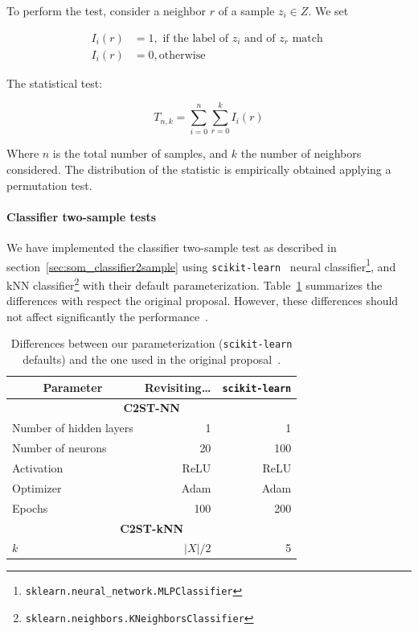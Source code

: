 To perform the test, consider a neighbor $r$ of a sample $z_i \in Z$. We set

\begin{equation}
\begin{split}
    I_i(r) &= 1, \textrm{ if the label of } z_i \textrm{ and of } z_r \textrm{ match }\\
    I_i(r) &= 0, \textrm{otherwise}
\end{split}
\end{equation}

The statistical test:

\begin{equation}
    T_{n,k} = \sum_{i=0}^{n}\sum_{r=0}^{k} I_i(r)
\end{equation}

Where $n$ is the total number of samples, and $k$ the number of neighbors considered.
The distribution of the statistic is empirically obtained applying a permutation test.
 
\paragraph{Classifier two-sample tests}
We have implemented the classifier two-sample test as described in section~\ref{sec:som_classifier2sample}
using \texttt{scikit-learn}~\cite{scikit-learn} neural
classifier\footnote{\texttt{sklearn.neural\_network.MLPClassifier}},
and \gls{kNN} classifier\footnote{\texttt{sklearn.neighbors.KNeighborsClassifier}}
with their default parameterization. Table~\ref{tab:classifier_diff} summarizes the differences
with respect the original proposal. However, these differences should not affect significantly
the performance~\cite{lopez2016revisiting}.

\begin{table}[htpb]
\centering
\begin{tabular}{lrr}
\multicolumn{1}{c}{\bfseries Parameter}       & \bfseries Revisiting\ldots & \texttt{scikit-learn}     \\ \hline
\multicolumn{3}{c}{\bfseries C2ST-NN} \\
Number of hidden layers &  1     &   1    \\
Number of neurons       & 20     & 100    \\
Activation              & ReLU   & ReLU   \\
Optimizer               & Adam   & Adam   \\
Epochs                  & 100    & 200    \\
\multicolumn{3}{c}{\bfseries C2ST-kNN} \\
$k$                     & $|X|/2$ & 5 \\
\end{tabular}
\caption[Differences between our parameterization]{
    Differences between our parameterization (\texttt{scikit-learn} defaults) and the one
    used in the original proposal~\cite{lopez2016revisiting}.
}
\label{tab:classifier_diff}
\end{table}

